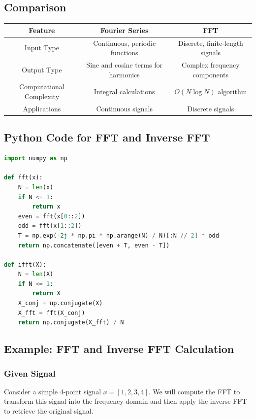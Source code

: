 \documentclass{article}
\begin{document}
\subsection{Comparison}

\begin{center}
\begin{tabular}{|c|c|c|}
\hline
Feature & Fourier Series & FFT \\
\hline
Input Type & Continuous, periodic functions & Discrete, finite-length signals \\
\hline
Output Type & Sine and cosine terms for harmonics & Complex frequency components \\
\hline
Computational Complexity & Integral calculations & \( O(N \log N) \) algorithm \\
\hline
Applications & Continuous signals & Discrete signals \\
\hline
\end{tabular}
\end{center}

\subsection{Python Code for FFT and Inverse FFT}

\begin{lstlisting}[language=Python]
import numpy as np

def fft(x):
    N = len(x)
    if N <= 1:
        return x
    even = fft(x[0::2])
    odd = fft(x[1::2])
    T = np.exp(-2j * np.pi * np.arange(N) / N)[:N // 2] * odd
    return np.concatenate([even + T, even - T])

def ifft(X):
    N = len(X)
    if N <= 1:
        return X
    X_conj = np.conjugate(X)
    X_fft = fft(X_conj)
    return np.conjugate(X_fft) / N
\end{lstlisting}


\subsection{Example: FFT and Inverse FFT Calculation}

\subsubsection{Given Signal}
Consider a simple 4-point signal \( x = [1, 2, 3, 4] \). We will compute the FFT to transform this signal into the frequency domain and then apply the inverse FFT to retrieve the original signal.
\end{document}

